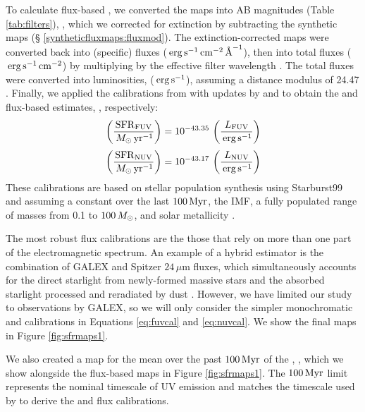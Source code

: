 \documentclass[iop, tighten]{emulateapj}
\begin{document}
To calculate flux-based , we converted the \fxobs{} maps into AB
magnitudes (Table \ref{tab:filters}), \xobs{}, which we corrected for
extinction by subtracting the synthetic \ax{} maps (\S
\ref{syntheticfluxmaps:fluxmod}). The extinction-corrected maps were converted
back into (specific) fluxes ($\,\mathrm{erg} \,\mathrm{s}^{-1} \,\mathrm{cm}^{-2} \,\textrm{\AA}^{-1}$), then into
total fluxes ($\,\mathrm{erg} \,\mathrm{s}^{-1} \,\mathrm{cm}^{-2}$) by multiplying by the effective
filter wavelength \citep[$1538.6\ang$ for \fuv{}, $2315.7\ang$ for
\nuv{};][]{Morrissey:2007}. The total fluxes were converted into luminosities,
\lx{} ($\,\mathrm{erg} \,\mathrm{s}^{-1}$), assuming a distance modulus of 24.47
\citep{McConnachie:2005}. Finally, we applied the calibrations from
\citet{Kennicutt:1998} with updates by \citet{Hao:2011} and \citet{Murphy:2011}
\citep[see the review by][]{Kennicutt:2012} to obtain the \fuv{} and \nuv{}
flux-based \sfr{} estimates, \sfrx{}, respectively:
\begin{equation}
\left(\frac{\sfrfuv}{\msun\yr^{-1}}\right) =
    10^{-43.35}\,\left(\frac{\lfuv}{\erg\ssec^{-1}}\right)
\label{eq:fuvcal}
\end{equation}
\begin{equation}
\left(\frac{\sfrnuv}{\msun\yr^{-1}}\right) =
    10^{-43.17}\,\left(\frac{\lnuv}{\erg\ssec^{-1}}\right)
\label{eq:nuvcal}
\end{equation}
These calibrations are based on stellar population synthesis using Starburst99
\citep{Leitherer:1999} and assuming a constant \sfr{} over the last $100\,\mathrm{Myr}$,
the \citet{Kroupa:2001} IMF, a fully populated range of masses from 0.1 to
$100\,M_\odot$, and solar metallicity \citep{Hao:2011}.

The most robust flux calibrations are the those that rely on more than one part
of the electromagnetic spectrum. An example of a hybrid estimator is the
combination of GALEX \fuv{} and Spitzer $24\,\mu\mathrm{m}$ fluxes, which
simultaneously accounts for the direct starlight from newly-formed massive
stars and the absorbed starlight processed and reradiated by dust
\citep[e.g.,][]{Leroy:2012}. However, we have limited our study to observations
by GALEX, so we will only consider the simpler monochromatic \fuv{} and \nuv{}
calibrations in Equations \ref{eq:fuvcal} and \ref{eq:nuvcal}. We show
the final \sfrx{} maps in Figure \ref{fig:sfrmaps1}.

We also created a map for the mean \sfr{} over the past $100\,\mathrm{Myr}$ of the
, \sfroneh{}, which we show alongside the flux-based \sfr{} maps in
Figure \ref{fig:sfrmaps1}. The $100\,\mathrm{Myr}$ limit represents the nominal timescale
of UV emission and matches the timescale used by \citet{Hao:2011} to derive the
\fuv{} and \nuv{} flux calibrations.
\end{document}
